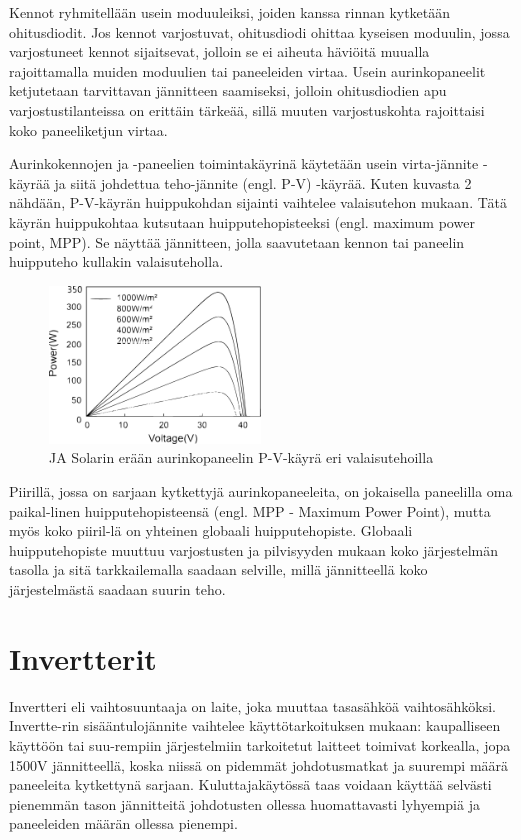   Kennot ryhmitellään usein moduuleiksi, joiden kanssa rinnan kytketään ohitusdiodit. Jos kennot varjostuvat, ohitusdiodi ohittaa kyseisen moduulin, jossa varjostuneet kennot sijaitsevat, jolloin se ei aiheuta häviöitä muualla rajoittamalla muiden moduulien tai paneeleiden virtaa. Usein aurinkopaneelit ketjutetaan tarvittavan jännitteen saamiseksi, jolloin ohitusdiodien apu varjostustilanteissa on erittäin tärkeää, sillä muuten varjostuskohta rajoittaisi koko paneeliketjun virtaa. \parencite{Willeke&Weber}

  Aurinkokennojen ja -paneelien toimintakäyrinä käytetään usein virta-jännite -käyrää ja siitä johdettua teho-jännite (engl. P-V) -käyrää. Kuten kuvasta 2 nähdään, P-V-käyrän huippukohdan sijainti vaihtelee valaisutehon mukaan. Tätä käyrän huippukohtaa kutsutaan huipputehopisteeksi (engl. maximum power point, MPP). Se näyttää jännitteen, jolla saavutetaan kennon tai paneelin huipputeho kullakin valaisuteholla.
  \begin{figure}
    \centering
    \includegraphics[width=0.5\textwidth]{figures/pvcurve}
    \caption{JA Solarin erään aurinkopaneelin P-V-käyrä eri valaisutehoilla \parencite{JASolar}}
  \end{figure}
  Piirillä, jossa on sarjaan kytkettyjä aurinkopaneeleita, on jokaisella paneelilla oma paikal-linen huipputehopisteensä (engl. MPP - Maximum Power Point), mutta myös koko piiril-lä on yhteinen globaali huipputehopiste. Globaali huipputehopiste muuttuu varjostusten ja pilvisyyden mukaan koko järjestelmän tasolla ja sitä tarkkailemalla saadaan selville, millä jännitteellä koko järjestelmästä saadaan suurin teho.

\section{Invertterit}
  Invertteri eli vaihtosuuntaaja on laite, joka muuttaa tasasähköä vaihtosähköksi. Invertte-rin sisääntulojännite vaihtelee käyttötarkoituksen mukaan: kaupalliseen käyttöön tai suu-rempiin järjestelmiin tarkoitetut laitteet toimivat korkealla, jopa 1500V jännitteellä, koska niissä on pidemmät johdotusmatkat ja suurempi määrä paneeleita kytkettynä sarjaan. Kuluttajakäytössä taas voidaan käyttää selvästi pienemmän tason jännitteitä johdotusten ollessa huomattavasti lyhyempiä ja paneeleiden määrän ollessa pienempi.

